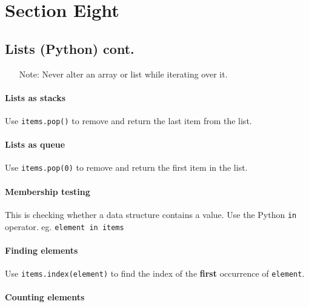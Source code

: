 \section{Section Eight}\label{sec:section_eight}

\subsection{Lists (Python) cont.}\label{sub:lists_python_cont_}

\begin{note}
    \begin{itemize}
        \item[Note:] Never alter an array or list while iterating over it.
    \end{itemize}
\end{note}

\paragraph{Lists as stacks}\label{par:lists_as_stacks}

Use \texttt{items.pop()} to remove and return the last item from the list.

\paragraph{Lists as queue}\label{par:lists_as_queue}

Use \texttt{items.pop(0)} to remove and return the first item in the list.

\paragraph{Membership testing}\label{par:membership_testing}

This is checking whether a data structure contains a value.
Use the Python \texttt{in} operator.
eg. \texttt{element in items}

\paragraph{Finding elements}\label{par:finding_elements}

Use \texttt{items.index(element)} to find the index of the \textbf{first} occurrence of \texttt{element}.

\paragraph{Counting elements}\label{par:counting_elements}

